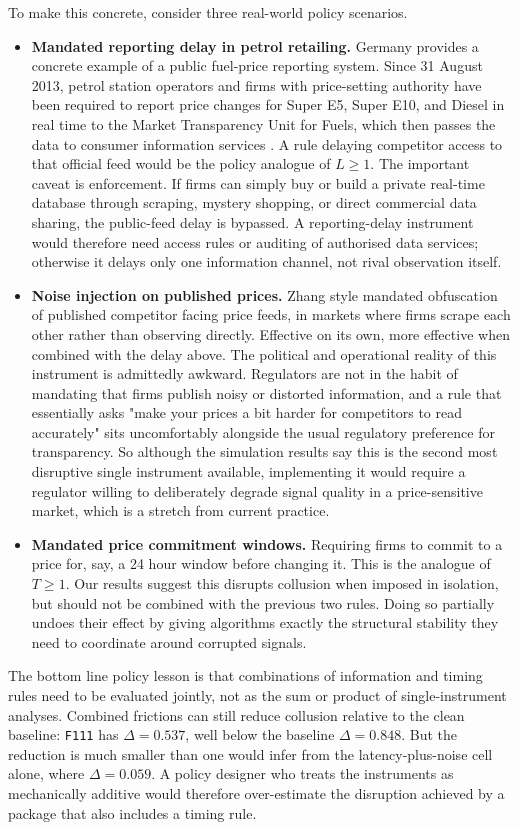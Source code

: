 To make this concrete, consider three real-world policy scenarios.
\begin{itemize}[topsep=2pt, itemsep=4pt]
    \item \textbf{Mandated reporting delay in petrol retailing.} Germany provides a concrete example of a public fuel-price reporting system. Since 31 August 2013, petrol station operators and firms with price-setting authority have been required to report price changes for Super E5, Super E10, and Diesel in real time to the Market Transparency Unit for Fuels, which then passes the data to consumer information services \citep{bundeskartellamtFuels}. A rule delaying competitor access to that official feed would be the policy analogue of $L\geq 1$. The important caveat is enforcement. If firms can simply buy or build a private real-time database through scraping, mystery shopping, or direct commercial data sharing, the public-feed delay is bypassed. A reporting-delay instrument would therefore need access rules or auditing of authorised data services; otherwise it delays only one information channel, not rival observation itself.
    \item \textbf{Noise injection on published prices.} Zhang style mandated obfuscation of published competitor facing price feeds, in markets where firms scrape each other rather than observing directly. Effective on its own, more effective when combined with the delay above. The political and operational reality of this instrument is admittedly awkward. Regulators are not in the habit of mandating that firms publish noisy or distorted information, and a rule that essentially asks "make your prices a bit harder for competitors to read accurately" sits uncomfortably alongside the usual regulatory preference for transparency. So although the simulation results say this is the second most disruptive single instrument available, implementing it would require a regulator willing to deliberately degrade signal quality in a price-sensitive market, which is a stretch from current practice.
    \item \textbf{Mandated price commitment windows.} Requiring firms to commit to a price for, say, a 24 hour window before changing it. This is the analogue of $T\geq 1$. Our results suggest this disrupts collusion when imposed in isolation, but should not be combined with the previous two rules. Doing so partially undoes their effect by giving algorithms exactly the structural stability they need to coordinate around corrupted signals.
\end{itemize}
The bottom line policy lesson is that combinations of information and timing rules need to be evaluated jointly, not as the sum or product of single-instrument analyses. Combined frictions can still reduce collusion relative to the clean baseline: \texttt{F111} has $\Delta=0.537$, well below the baseline $\Delta=0.848$. But the reduction is much smaller than one would infer from the latency-plus-noise cell alone, where $\Delta=0.059$. A policy designer who treats the instruments as mechanically additive would therefore over-estimate the disruption achieved by a package that also includes a timing rule.
